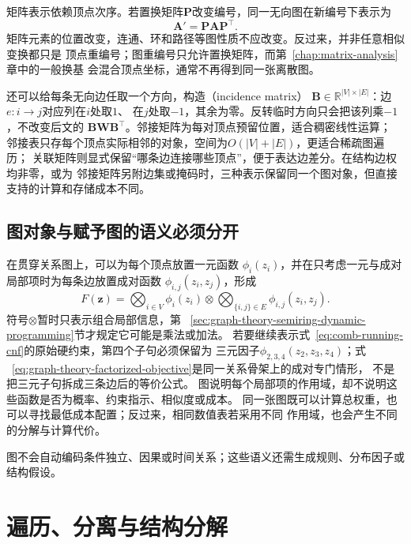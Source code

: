 矩阵表示依赖顶点次序。若置换矩阵\(\bm{P}\)改变编号，同一无向图在新编号下表示为
\begin{equation}
  \bm{A}'=\bm{P}\bm{A}\bm{P}^{\top}.
  \label{eq:graph-theory-adjacency-relabel}
\end{equation}
矩阵元素的位置改变，连通、环和路径等图性质不应改变。反过来，并非任意相似变换都只是
顶点重编号；图重编号只允许置换矩阵，而第~\ref{chap:matrix-analysis}章中的一般换基
会混合顶点坐标，通常不再得到同一张离散图。

还可以给每条无向边任取一个方向，构造（incidence matrix）
\(\bm{B}\in\mathbb{R}^{|V|\times|E|}\)：边\(e:i\to j\)对应列在\(i\)处取\(1\)、
在\(j\)处取\(-1\)，其余为零。反转临时方向只会把该列乘\(-1\)，不改变后文的
\(\bm{B}\bm{W}\bm{B}^{\top}\)。邻接矩阵为每对顶点预留位置，适合稠密线性运算；
邻接表只存每个顶点实际相邻的对象，空间为\(O(|V|+|E|)\)，更适合稀疏图遍历；
关联矩阵则显式保留“哪条边连接哪些顶点”，便于表达边差分。在结构边权均非零，或为
邻接矩阵另附边集或掩码时，三种表示保留同一个图对象，但直接支持的计算和存储成本不同。

\subsection{图对象与赋予图的语义必须分开}

在贯穿关系图上，可以为每个顶点放置一元函数
\(\phi_i(z_i)\)，并在只考虑一元与成对局部项时为每条边放置成对函数
\(\phi_{i,j}(z_i,z_j)\)，形成
\begin{equation}
  F(\bm{z})=
  \bigotimes_{i\in V}\phi_i(z_i)\otimes
  \bigotimes_{\{i,j\}\in E}\phi_{i,j}(z_i,z_j).
  \label{eq:graph-theory-factorized-objective}
\end{equation}
符号\(\otimes\)暂时只表示组合局部信息，第
~\ref{sec:graph-theory-semiring-dynamic-programming}节才规定它可能是乘法或加法。
若要继续表示式~\eqref{eq:comb-running-cnf}的原始硬约束，第四个子句必须保留为
三元因子\(\phi_{2,3,4}(z_2,z_3,z_4)\)；式
~\eqref{eq:graph-theory-factorized-objective}是同一关系骨架上的成对专门情形，
不是把三元子句拆成三条边后的等价公式。
图说明每个局部项的作用域，却不说明这些函数是否为概率、约束指示、相似度或成本。
同一张图既可以计算总权重，也可以寻找最低成本配置；反过来，相同数值表若采用不同
作用域，也会产生不同的分解与计算代价。

图不会自动编码条件独立、因果或时间关系；这些语义还需生成规则、分布因子或结构假设。

\section{遍历、分离与结构分解}
\label{sec:graph-theory-traversal-separation-decomposition}

